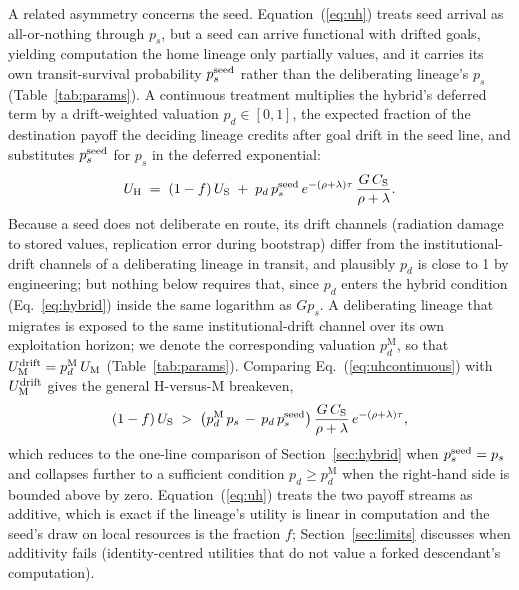 \documentclass[11pt]{article}
\begin{document}
A related asymmetry concerns the seed. Equation~(\ref{eq:uh}) treats seed arrival as all-or-nothing through $p_{s}$, but a seed can arrive functional with drifted goals, yielding computation the home lineage only partially values, and it carries its own transit-survival probability $p_{s}^{\rm seed}$ rather than the deliberating lineage's $p_{s}$ (Table~\ref{tab:params}). A continuous treatment multiplies the hybrid's deferred term by a drift-weighted valuation $p_{d} \in [0,1]$, the expected fraction of the destination payoff the deciding lineage credits after goal drift in the seed line, and substitutes $p_s^{\rm seed}$ for $p_s$ in the deferred exponential:
\begin{equation}
U_{\mathrm H} \;=\; (1-f)\,U_{\mathrm S} \;+\; p_{d}\,p_{s}^{\rm seed}\, e^{-(\rho+\lambda)\tau}\, \frac{G\,C_{\mathrm S}}{\rho+\lambda}.
\label{eq:uhcontinuous}
\end{equation}
Because a seed does not deliberate en route, its drift channels (radiation damage to stored values, replication error during bootstrap) differ from the institutional-drift channels of a deliberating lineage in transit, and plausibly $p_{d}$ is close to 1 by engineering; but nothing below requires that, since $p_{d}$ enters the hybrid condition (Eq.~\ref{eq:hybrid}) inside the same logarithm as $G p_{s}$. A deliberating lineage that migrates is exposed to the same institutional-drift channel over its own exploitation horizon; we denote the corresponding valuation $p_{d}^{\mathrm M}$, so that $U_{\mathrm M}^{\rm drift} = p_{d}^{\mathrm M}\,U_{\mathrm M}$ (Table~\ref{tab:params}). Comparing Eq.~(\ref{eq:uhcontinuous}) with $U_{\mathrm M}^{\rm drift}$ gives the general H-versus-M breakeven,
\begin{equation}
(1-f)\,U_{\mathrm S} \;>\; \big(p_{d}^{\mathrm M}\,p_{s} \,-\, p_{d}\,p_{s}^{\rm seed}\big)\,\frac{G\,C_{\mathrm S}}{\rho+\lambda}\,e^{-(\rho+\lambda)\tau},
\label{eq:hvsmgeneral}
\end{equation}
which reduces to the one-line comparison of Section~\ref{sec:hybrid} when $p_s^{\rm seed} = p_s$ and collapses further to a sufficient condition $p_d \geq p_d^{\mathrm M}$ when the right-hand side is bounded above by zero. Equation~(\ref{eq:uh}) treats the two payoff streams as additive, which is exact if the lineage's utility is linear in computation and the seed's draw on local resources is the fraction $f$; Section~\ref{sec:limits} discusses when additivity fails (identity-centred utilities that do not value a forked descendant's computation).
\end{document}
